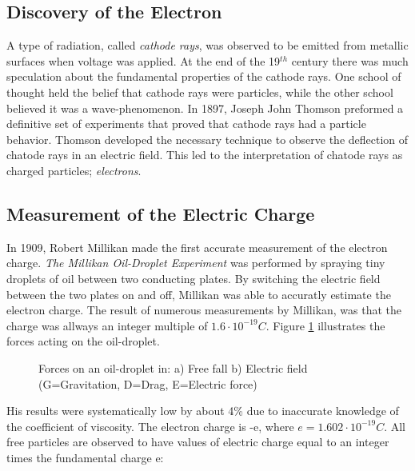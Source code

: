 \subsection*{Discovery of the Electron}

A type of radiation, called \emph{cathode rays}, was observed to be
emitted from metallic surfaces when voltage was applied. At the end of
the 19$^{th}$ century there was much speculation about the fundamental
properties of the cathode rays. One school of thought held the belief
that cathode rays were particles, while the other school believed it
was a wave-phenomenon. In 1897, Joseph John Thomson preformed a
definitive set of experiments that proved that cathode rays had
a particle behavior. Thomson developed the necessary technique to
observe the deflection of chatode rays in an electric field. This led
to the interpretation of chatode rays as charged particles;
\emph{electrons}.

\subsection*{Measurement of the Electric Charge}

In 1909, Robert Millikan made the first accurate measurement of the
electron charge. \emph{The Millikan Oil-Droplet Experiment} was
performed by spraying tiny droplets of oil between two conducting
plates. By switching the electric field between the two plates on and
off, Millikan was able to accuratly estimate the electron charge. The
result of numerous measurements by Millikan, was that the charge was
allways an integer multiple of $1.6 \cdot 10^{-19}C$.
Figure \ref{oil_droplet} illustrates the forces acting on the
oil-droplet.

\begin{figure}[hbtp]
\begin{center}
  \caption{
    Forces on an oil-droplet in: \newline
    \hspace*{1.5cm}
           a) Free fall          \newline
    \hspace*{1.5cm}
	   b) Electric field     \newline
    (G=Gravitation, D=Drag, E=Electric force)
  }
  \label{oil_droplet}
\end{center}
\end{figure}

His results were systematically low by about 4\% due to inaccurate
knowledge of the coefficient of viscosity. \newline
The electron charge is -e,
where $e = 1.602 \cdot 10^{-19}C$. All free particles are observed to
have values of electric charge equal to an integer times the
fundamental charge e:

